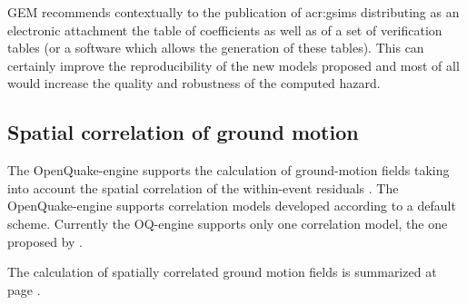 GEM recommends contextually to the publication of \glspl{acr:gsim}
distributing as an electronic attachment the table of coefficients as well 
as of a set of verification tables (or a software which allows the generation 
of these tables). This can certainly improve the reproducibility of the 
new models proposed and most of all would increase the quality and 
robustness of the computed hazard.
%
%
%
\subsection{Spatial correlation of ground motion}
%
The OpenQuake-engine supports the calculation of ground-motion fields taking
into account the spatial correlation of the within-event residuals
\citep{boore2003}.
%
The OpenQuake-engine supports correlation models developed according to a
default scheme. Currently the OQ-engine supports only one correlation model, the
one proposed by \citet{jayaram2009}.

The calculation of spatially correlated ground motion fields is summarized at
page \pageref{sec:event_based}.
